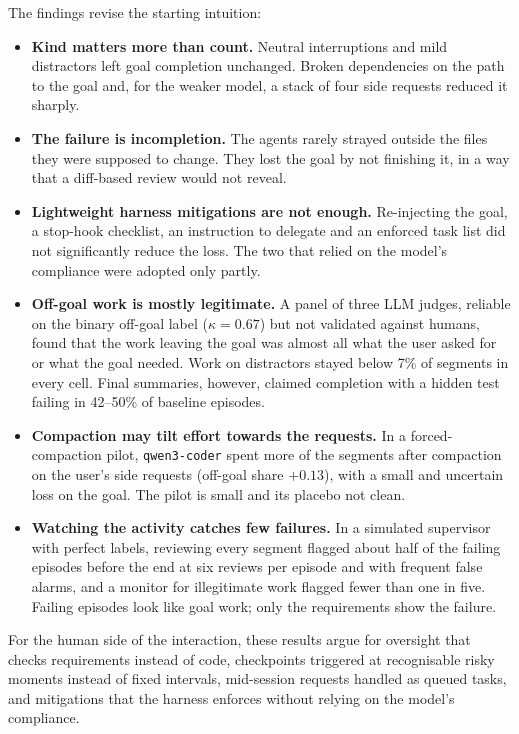 The findings revise the starting intuition:
\begin{itemize}
  \item \textbf{Kind matters more than count.} Neutral interruptions and mild distractors left goal
        completion unchanged. Broken dependencies on the path to the goal and, for the weaker model,
        a stack of four side requests reduced it sharply.
  \item \textbf{The failure is incompletion.} The agents rarely strayed outside the files they were
        supposed to change. They lost the goal by not finishing it, in a way that a diff-based review
        would not reveal.
  \item \textbf{Lightweight harness mitigations are not enough.} Re-injecting the goal, a stop-hook
        checklist, an instruction to delegate and an enforced task list did not significantly reduce
        the loss. The two that relied on the model's compliance were adopted only partly.
  \item \textbf{Off-goal work is mostly legitimate.} A panel of three LLM judges, reliable on the
        binary off-goal label ($\kappa=0.67$) but not validated against humans, found that the work
        leaving the goal was almost all what the user asked for or what the goal needed. Work on
        distractors stayed below 7\% of segments in every cell. Final summaries, however, claimed
        completion with a hidden test failing in 42--50\% of baseline episodes.
  \item \textbf{Compaction may tilt effort towards the requests.} In a forced-compaction pilot,
        \texttt{qwen3-coder} spent more of the segments after compaction on the user's side requests
        (off-goal share $+0.13$), with a small and uncertain loss on the goal. The pilot is small and
        its placebo not clean.
  \item \textbf{Watching the activity catches few failures.} In a simulated supervisor with perfect
        labels, reviewing every segment flagged about half of the failing episodes before the end at
        six reviews per episode and with frequent false alarms, and a monitor for illegitimate work
        flagged fewer than one in five. Failing episodes look like goal work; only the requirements
        show the failure.
\end{itemize}
For the human side of the interaction, these results argue for oversight that checks requirements
instead of code, checkpoints triggered at recognisable risky moments instead of fixed intervals,
mid-session requests handled as queued tasks, and mitigations that the harness enforces without
relying on the model's compliance.

